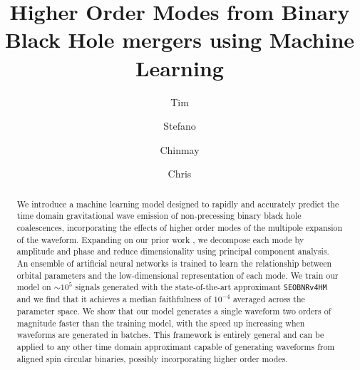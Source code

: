 \documentclass[twocolumn,showpacs,preprintnumbers,nofootinbib,prd,
superscriptaddress,10pt]{revtex4-1}
\begin{document}
\begin{abstract}
We introduce a machine learning model designed to rapidly and accurately predict the time domain gravitational wave emission of non-precessing binary black hole coalescences, incorporating the effects of higher order modes of the multipole expansion of the waveform. 
Expanding on our prior work \cite{Schmidt:2020yuu}, we decompose each mode by amplitude and phase and reduce dimensionality using principal component analysis. An ensemble of artificial neural networks is trained to learn the relationship between orbital parameters and the low-dimensional representation of each mode.
We train our model on $\sim 10^5$ signals generated with the state-of-the-art approximant \texttt{SEOBNRv4HM} and we find that it achieves a median faithfulness of $10^{-4}$ averaged across the parameter space. We show that our model generates a single waveform two orders of magnitude faster than the training model, with the speed up increasing when waveforms are generated in batches.
This framework is entirely general and can be applied to any other time domain approximant capable of generating waveforms from aligned spin circular binaries, possibly incorporating higher order modes.
\end{abstract}
	
	\title{Higher Order Modes from Binary Black Hole mergers using Machine Learning}
	\author{Tim }
	\author{Stefano  }
	\author{Chinmay }
	\author{Chris }
	\maketitle
\end{document}
